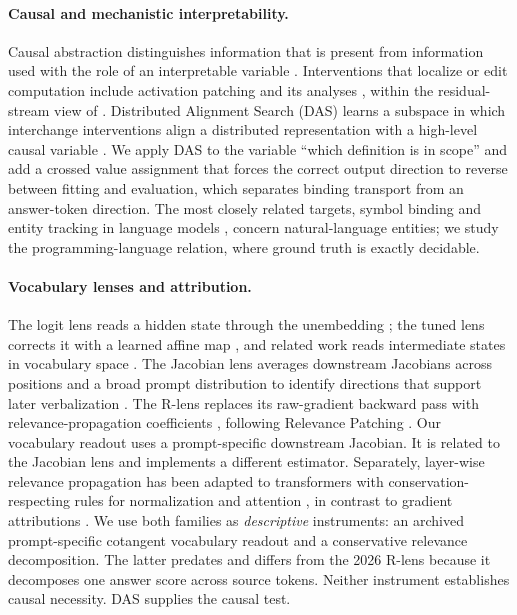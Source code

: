 \documentclass[10pt]{article}
\begin{document}
\paragraph{Causal and mechanistic interpretability.} Causal abstraction
distinguishes information that is present from information used with the role of
an interpretable variable \citep{geiger2021causal,vig2020causal}. Interventions
that localize or edit computation include activation patching and its analyses
\citep{meng2022rome,wang2023ioi,conmy2023acdc,zhang2024patching,heimersheim2024patching},
within the residual-stream view of \citet{elhage2021mathematical}. Distributed
Alignment Search (DAS) learns a subspace in which interchange interventions align
a distributed representation with a high-level causal variable
\citep{geiger2024das,wu2023boundless}. We apply DAS to the variable ``which
definition is in scope'' and add a crossed value assignment that forces the
correct output direction to reverse between fitting and evaluation, which
separates binding transport from an answer-token direction. The most closely
related targets, symbol binding and entity tracking in language models
\citep{smolensky1990tensor,feng2023entities,kim2023entity,prakash2024finetuning}%
, concern natural-language entities; we study the programming-language relation,
where ground truth is exactly decidable.

\paragraph{Vocabulary lenses and attribution.} The logit lens reads a hidden
state through the unembedding \citep{nostalgebraist2020logitlens}; the tuned lens
corrects it with a learned affine map \citep{belrose2023tunedlens}, and related
work reads intermediate states in vocabulary space
\citep{geva2022ffn,dar2023embedding}. The Jacobian lens averages downstream
Jacobians across positions and a broad prompt distribution to identify directions
that support later verbalization \citep{gurnee2026workspace}. The R-lens replaces
its raw-gradient backward pass with relevance-propagation coefficients
\citep{blank2026rlens}, following Relevance Patching
\citep{jafari2025relp}. Our vocabulary readout uses a prompt-specific downstream
Jacobian. It is related to the Jacobian lens and implements a different estimator.
Separately, layer-wise relevance
propagation \citep{bach2015lrp} has been adapted to transformers with
conservation-respecting rules for normalization and attention
\citep{ali2022xai,achtibat2024attnlrp}, in contrast to gradient attributions
\citep{sundararajan2017ig,chefer2021transformer}. We use both families as
\emph{descriptive} instruments: an archived prompt-specific cotangent vocabulary readout and
a conservative relevance decomposition. The latter predates and differs from the
2026 R-lens because it decomposes one answer score across source tokens. Neither
instrument establishes causal necessity. DAS supplies the causal test.
\end{document}
